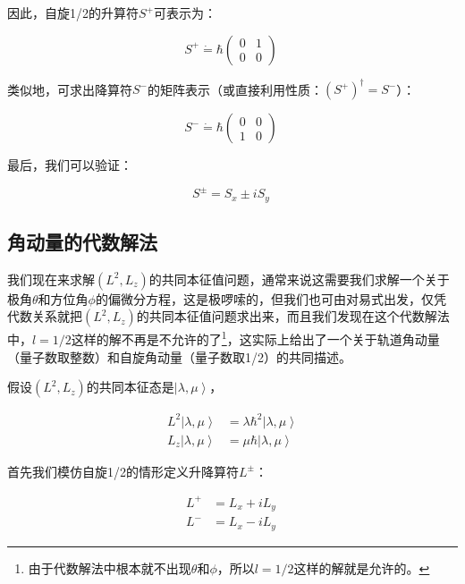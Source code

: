 因此，自旋1/2的升算符$S^+$可表示为：

\begin{equation}
S^+ \dot = \hbar \left(  \begin{array}{ccc}  0 &  1 \\  0 & 0  \end{array} \right)~
\end{equation}

类似地，可求出降算符$S^-$的矩阵表示（或直接利用性质：$\left( S^+ \right)^\dagger = S^-$）：

\begin{equation}
S^- \dot = \hbar \left(  \begin{array}{ccc}  0 &  0 \\  1 & 0  \end{array} \right)~
\end{equation}

最后，我们可以验证：

\begin{equation}
S^{\pm} = S_x \pm i S_y~
\end{equation}

\subsection{角动量的代数解法}

我们现在来求解$(L^2, L_z)$的共同本征值问题，通常来说这需要我们求解一个关于极角$\theta$和方位角$\phi$的偏微分方程，这是极啰嗦的，但我们也可由对易式出发，仅凭代数关系就把$(L^2, L_z)$的共同本征值问题求出来，而且我们发现在这个代数解法中，$l = 1/2$这样的解不再是不允许的了\footnote{由于代数解法中根本就不出现$\theta$和$\phi$，所以$l= 1/2$这样的解就是允许的。}，这实际上给出了一个关于轨道角动量（量子数取整数）和自旋角动量（量子数取1/2）的共同描述。

假设$(L^2, L_z)$的共同本征态是$\left| \lambda, \mu  \right\rangle$，

\begin{align}
L^2 \left| \lambda, \mu \right\rangle &= \lambda \hbar^2 \left| \lambda, \mu  \right\rangle \\
L_z \left| \lambda, \mu  \right\rangle &= \mu \hbar \left| \lambda, \mu  \right\rangle~
\end{align}


首先我们模仿自旋1/2的情形定义升降算符$L^{\pm}$：

\begin{align}
L^+ & = L_x + i L_y \\
L^- & = L_x - i L_y ~
\end{align}

